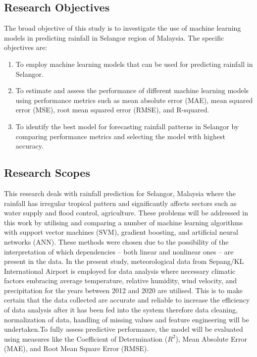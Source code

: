 \documentclass{article}
\begin{document}
\subsection{Research Objectives}
The broad objective of this study is to investigate the use of machine learning models in
predicting rainfall in Selangor region of Malaysia. The specific objectives are:
\begin{enumerate}
    \item To employ machine learning models that can be used for predicting rainfall in
Selangor.
    \item To estimate and assess the performance of different machine learning models using
performance metrics such as mean absolute error (MAE), mean squared error (MSE),
root mean squared error (RMSE), and R-squared.
    \item To identify the best model for forecasting rainfall patterns in Selangor by comparing
performance metrics and selecting the model with highest accuracy.
\end{enumerate}

\subsection{Research Scopes}
This research deals with rainfall prediction for Selangor, Malaysia where the rainfall has
irregular tropical pattern and significantly affects sectors such as water supply and flood
control, agriculture. These problems will be addressed in this work by utilising and comparing
a number of machine learning algorithms with support vector machines (SVM), gradient
boosting, and artificial neural networks (ANN). These methods were chosen due to the
possibility of the interpretation of which dependencies – both linear and nonlinear ones – are
present in the data. In the present study, meteorological data from Sepang/KL International
Airport is employed for data analysis where necessary climatic factors embracing average
temperature, relative humidity, wind velocity, and precipitation for the years between 2012 and
2020 are utilised. This is to make certain that the data collected are accurate and reliable to
increase the efficiency of data analysis after it has been fed into the system therefore data
cleaning, normalization of data, handling of missing values and feature engineering will be
undertaken.To fully assess predictive performance, the model will be evaluated using measures
like the Coefficient of Determination ($R^2$), Mean Absolute Error (MAE), and Root Mean
Square Error (RMSE).
\end{document}
